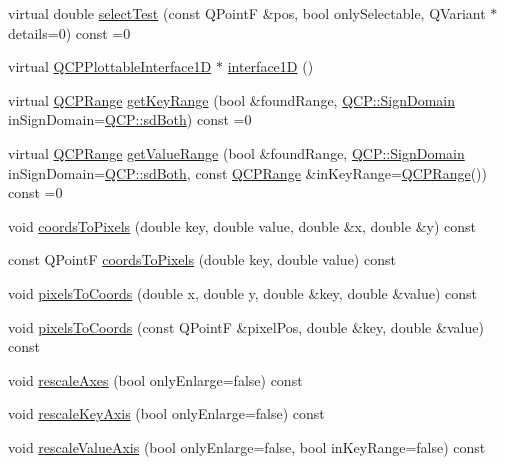 \begin{DoxyCompactItemize}
virtual double \hyperlink{classQCPAbstractPlottable_a38efe9641d972992a3d44204bc80ec1d}{select\+Test} (const Q\+PointF \&pos, bool only\+Selectable, Q\+Variant $\ast$details=0) const =0
\item 
virtual \hyperlink{classQCPPlottableInterface1D}{Q\+C\+P\+Plottable\+Interface1D} $\ast$ \hyperlink{classQCPAbstractPlottable_a81fd9fd5c4f429c074785e2eb238a8e7}{interface1D} ()
\item 
virtual \hyperlink{classQCPRange}{Q\+C\+P\+Range} \hyperlink{classQCPAbstractPlottable_a4da16d3cd4b509e1104a9b0275623c96}{get\+Key\+Range} (bool \&found\+Range, \hyperlink{namespaceQCP_afd50e7cf431af385614987d8553ff8a9}{Q\+C\+P\+::\+Sign\+Domain} in\+Sign\+Domain=\hyperlink{namespaceQCP_afd50e7cf431af385614987d8553ff8a9aa38352ef02d51ddfa4399d9551566e24}{Q\+C\+P\+::sd\+Both}) const =0
\item 
virtual \hyperlink{classQCPRange}{Q\+C\+P\+Range} \hyperlink{classQCPAbstractPlottable_a4de773988b21ed090fddd27c6a3a3dcb}{get\+Value\+Range} (bool \&found\+Range, \hyperlink{namespaceQCP_afd50e7cf431af385614987d8553ff8a9}{Q\+C\+P\+::\+Sign\+Domain} in\+Sign\+Domain=\hyperlink{namespaceQCP_afd50e7cf431af385614987d8553ff8a9aa38352ef02d51ddfa4399d9551566e24}{Q\+C\+P\+::sd\+Both}, const \hyperlink{classQCPRange}{Q\+C\+P\+Range} \&in\+Key\+Range=\hyperlink{classQCPRange}{Q\+C\+P\+Range}()) const =0
\item 
void \hyperlink{classQCPAbstractPlottable_ade710a776104b14c1c835168ce1bfc5c}{coords\+To\+Pixels} (double key, double value, double \&x, double \&y) const 
\item 
const Q\+PointF \hyperlink{classQCPAbstractPlottable_a9fd1c9df8391781f05b0be22fbe91e13}{coords\+To\+Pixels} (double key, double value) const 
\item 
void \hyperlink{classQCPAbstractPlottable_a10408828446e9e0681c46d65120f382e}{pixels\+To\+Coords} (double x, double y, double \&key, double \&value) const 
\item 
void \hyperlink{classQCPAbstractPlottable_a3e2c361cfcdfd5d803ada4d333a07e15}{pixels\+To\+Coords} (const Q\+PointF \&pixel\+Pos, double \&key, double \&value) const 
\item 
void \hyperlink{classQCPAbstractPlottable_a7e8fc3be43c27ccacd70a7bf9d74a5cd}{rescale\+Axes} (bool only\+Enlarge=false) const 
\item 
void \hyperlink{classQCPAbstractPlottable_a1acecfcca3e7fcda00fcbaa3c886386f}{rescale\+Key\+Axis} (bool only\+Enlarge=false) const 
\item 
void \hyperlink{classQCPAbstractPlottable_a4336ede4d4ef615022356316d9e9c362}{rescale\+Value\+Axis} (bool only\+Enlarge=false, bool in\+Key\+Range=false) const 

\end{DoxyCompactItemize}
